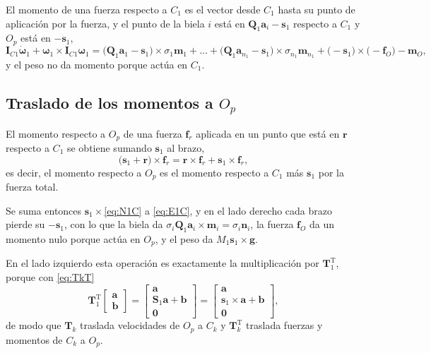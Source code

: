 \documentclass[11pt]{article}
\newcommand{\T}{^{\mathrm{T}}}
\newcommand{\wv}{\boldsymbol{\omega}}
\newcommand{\IC}[1]{\mathbf{I}_{C#1}}
\begin{document}
El momento de una fuerza respecto a $C_1$ es el vector desde $C_1$ hasta su punto de aplicación por la fuerza, y el punto de la biela $i$ está en $\mathbf{Q}_1\mathbf{a}_i-\mathbf{s}_1$ respecto a $C_1$ y $O_p$ está en $-\mathbf{s}_1$,
\begin{equation}
\IC{1}\dot{\wv}_1+\wv_1\times\IC{1}\wv_1
=\big(\mathbf{Q}_1\mathbf{a}_1-\mathbf{s}_1\big)\times\sigma_1\mathbf{m}_1+\dots+\big(\mathbf{Q}_1\mathbf{a}_{n_1}-\mathbf{s}_1\big)\times\sigma_{n_1}\mathbf{m}_{n_1}
+\big(-\mathbf{s}_1\big)\times\big(-\mathbf{f}_O\big)-\mathbf{m}_O ,
\label{eq:E1C}
\end{equation}
y el peso no da momento porque actúa en $C_1$.

\subsection{Traslado de los momentos a $O_p$}

El momento respecto a $O_p$ de una fuerza $\mathbf{f}_r$ aplicada en un punto que está en $\mathbf{r}$ respecto a $C_1$ se obtiene sumando $\mathbf{s}_1$ al brazo,
\begin{equation}
\big(\mathbf{s}_1+\mathbf{r}\big)\times\mathbf{f}_r=\mathbf{r}\times\mathbf{f}_r+\mathbf{s}_1\times\mathbf{f}_r,
\label{eq:traslado}
\end{equation}
es decir, el momento respecto a $O_p$ es el momento respecto a $C_1$ más $\mathbf{s}_1$ por la fuerza total.

Se suma entonces $\mathbf{s}_1\times$\eqref{eq:N1C} a \eqref{eq:E1C}, y en el lado derecho cada brazo pierde su $-\mathbf{s}_1$, con lo que la biela da $\sigma_i\mathbf{Q}_1\mathbf{a}_i\times\mathbf{m}_i=\sigma_i\mathbf{n}_i$, la fuerza $\mathbf{f}_O$ da un momento nulo porque actúa en $O_p$, y el peso da $M_1\mathbf{s}_1\times\mathbf{g}$.

En el lado izquierdo esta operación es exactamente la multiplicación por $\mathbf{T}_1\T$, porque con \eqref{eq:TkT}
\begin{equation}
\mathbf{T}_1\T
\begin{bmatrix}\mathbf{a}\\ \mathbf{b}\end{bmatrix}
=
\begin{bmatrix}\mathbf{a}\\ \mathbf{S}_1\mathbf{a}+\mathbf{b}\\ \mathbf{0}\end{bmatrix}
=
\begin{bmatrix}\mathbf{a}\\ \mathbf{s}_1\times\mathbf{a}+\mathbf{b}\\ \mathbf{0}\end{bmatrix},
\label{eq:T1ab}
\end{equation}
de modo que $\mathbf{T}_k$ traslada velocidades de $O_p$ a $C_k$ y $\mathbf{T}_k\T$ traslada fuerzas y momentos de $C_k$ a $O_p$.
\end{document}
